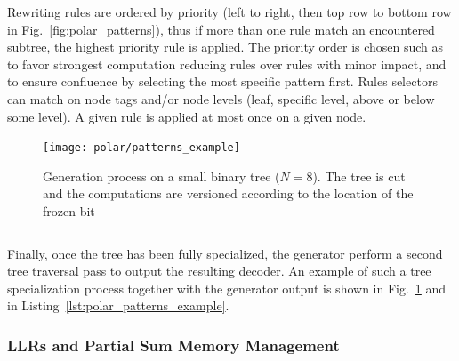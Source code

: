 Rewriting rules are ordered by priority (left to right, then top row to bottom
row in Fig.~\ref{fig:polar_patterns}), thus if more than one rule match an
encountered subtree, the highest priority rule is applied. The priority order is
chosen such as to favor strongest computation reducing rules over rules with
minor impact, and to ensure confluence by selecting the most specific pattern
first. Rules selectors can match on node tags and/or node levels (leaf, specific
level, above or below some level). A given rule is applied at most once on a
given node.

\begin{figure}
  \centering
  \texttt{[image: polar/patterns\_example]}
  \caption{Generation process on a small binary tree ($N = 8$). The tree is cut
    and the computations are versioned according to the location of the frozen
    bit}
  \label{fig:polar_patterns_example}
\end{figure}

\begin{listing}
  \inputminted[frame=lines,linenos]{C++}{main/chapter3/src/polar/generated_sc_decoder.cpp}
  \caption{The final code generated corresponding to the pruned tree in
    Fig.~\ref{fig:polar_patterns_example}.}
  \label{lst:polar_patterns_example}
\end{listing}

Finally, once the tree has been fully specialized, the generator perform a
second tree traversal pass to output the resulting decoder. An example of such a
tree specialization process together with the generator output is shown in
Fig.~\ref{fig:polar_patterns_example} and in
Listing~\ref{lst:polar_patterns_example}.

\subsubsection{LLRs and Partial Sum Memory Management}

